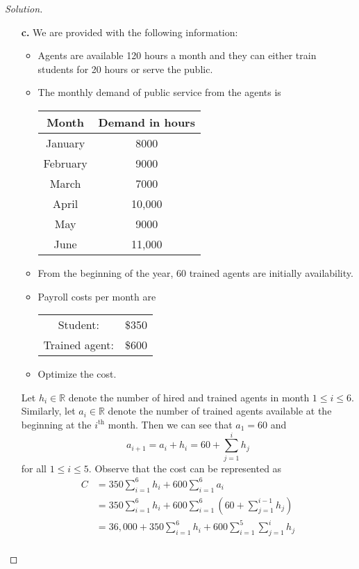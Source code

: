 \documentclass[ 12pt ]{article}
\begin{document}
\begin{enumerate}
\begin{proof}[Solution]
\begin{enumerate}
				\item[\textbf{c.}] We are provided with the following information:
					\begin{itemize}
						\item Agents are available 120 hours a month and they can either train students for 20 hours or serve the public.
						\item The monthly demand of public service from the agents is
							\begin{center}
							\begin{tabular}{c|c}
								Month & Demand in hours \\
								\hline
								January & 8000 \\
								February & 9000 \\
								March & 7000 \\
								April & 10,000 \\
								May & 9000 \\
								June & 11,000
							\end{tabular}
							\end{center}
						\item From the beginning of the year, 60 trained agents are initially availability.
						\item Payroll costs per month are
							\begin{center}
							\begin{tabular}{cc}
								Student: & \$350 \\
								Trained agent: & \$600
							\end{tabular}
							\end{center}
						\item Optimize the cost.
					\end{itemize}
					Let $h_i \in \mathbb{R}$ denote the number of hired and trained agents in month $1 \leq i \leq 6$. Similarly, let $a_i \in \mathbb{R}$ denote the number of trained
					agents available at the beginning at the $i^{\mathrm{th}}$ month. Then we can see that $a_1 = 60$ and $$a_{i + 1} = a_i + h_i = 60 + \sum_{j = 1}^i h_j$$ for all $1
					\leq i \leq 5$. Observe that the cost can be represented as
					\begin{align*}
						C &= 350\sum_{i = 1}^6 h_i + 600\sum_{i = 1}^6 a_i \\
						&= 350\sum_{i = 1}^6 h_i + 600\sum_{i = 1}^6 \left ( 60 + \sum_{j = 1}^{i-1} h_j \right ) \\
						&= 36,000 + 350\sum_{i = 1}^6 h_i + 600\sum_{i = 1}^5 \sum_{j = 1}^i h_j \\

\end{align*}
\end{enumerate}
\end{proof}
\end{enumerate}
\end{document}
